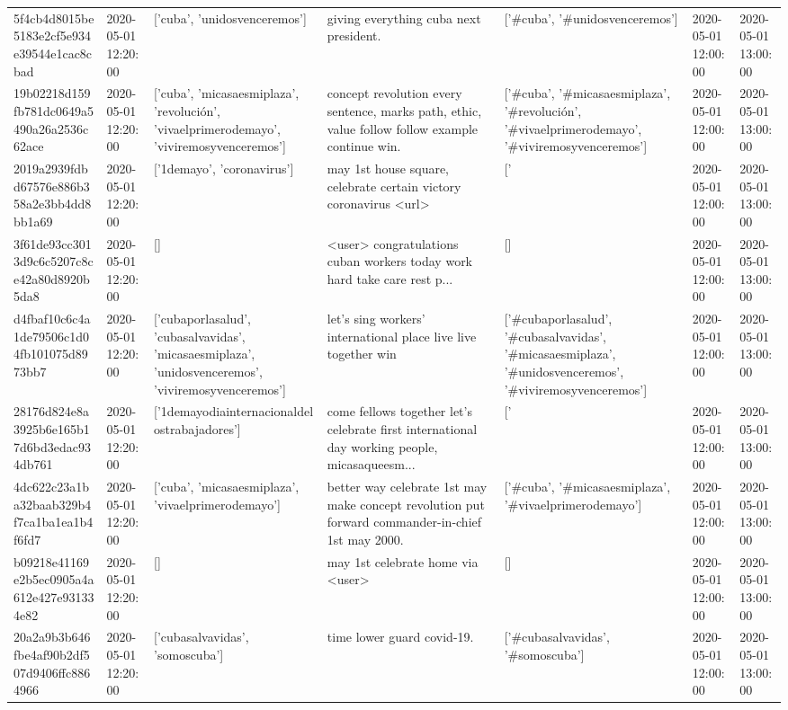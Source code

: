 \begin{tabular}{lllllll}
5f4cb4d8015be5183e2cf5e934e39544e1cac8cbad & 2020-05-01 12:20:00 & ['cuba', 'unidosvenceremos'] & giving everything cuba next president. & ['#cuba', '#unidosvenceremos'] & 2020-05-01 12:00:00 & 2020-05-01 13:00:00 \\
19b02218d159fb781dc0649a5490a26a2536c62ace & 2020-05-01 12:20:00 & ['cuba', 'micasaesmiplaza', 'revolución', 'vivaelprimerodemayo', 'viviremosyvenceremos'] & concept revolution every sentence, marks path, ethic, value follow follow example continue win. & ['#cuba', '#micasaesmiplaza', '#revolución', '#vivaelprimerodemayo', '#viviremosyvenceremos'] & 2020-05-01 12:00:00 & 2020-05-01 13:00:00 \\
2019a2939fdbd67576e886b358a2e3bb4dd8bb1a69 & 2020-05-01 12:20:00 & ['1demayo', 'coronavirus'] & may 1st house square, celebrate certain victory coronavirus <url> & ['#1demayo', '#coronavirus'] & 2020-05-01 12:00:00 & 2020-05-01 13:00:00 \\
3f61de93cc3013d9c6c5207c8ce42a80d8920b5da8 & 2020-05-01 12:20:00 & [] & <user> congratulations cuban workers today work hard take care rest p... & [] & 2020-05-01 12:00:00 & 2020-05-01 13:00:00 \\
d4fbaf10c6c4a1de79506c1d04fb101075d8973bb7 & 2020-05-01 12:20:00 & ['cubaporlasalud', 'cubasalvavidas', 'micasaesmiplaza', 'unidosvenceremos', 'viviremosyvenceremos'] & let's sing workers' international place live live together win & ['#cubaporlasalud', '#cubasalvavidas', '#micasaesmiplaza', '#unidosvenceremos', '#viviremosyvenceremos'] & 2020-05-01 12:00:00 & 2020-05-01 13:00:00 \\
28176d824e8a3925b6e165b17d6bd3edac934db761 & 2020-05-01 12:20:00 & ['1demayodiainternacionaldelostrabajadores'] & come fellows together let's celebrate first international day working people, micasaqueesm... & ['#1demayodiainternacionaldelostrabajadores'] & 2020-05-01 12:00:00 & 2020-05-01 13:00:00 \\
4dc622c23a1ba32baab329b4f7ca1ba1ea1b4f6fd7 & 2020-05-01 12:20:00 & ['cuba', 'micasaesmiplaza', 'vivaelprimerodemayo'] & better way celebrate 1st may make concept revolution put forward commander-in-chief 1st may 2000. & ['#cuba', '#micasaesmiplaza', '#vivaelprimerodemayo'] & 2020-05-01 12:00:00 & 2020-05-01 13:00:00 \\
b09218e41169e2b5ec0905a4a612e427e931334e82 & 2020-05-01 12:20:00 & [] & may 1st celebrate home via <user> & [] & 2020-05-01 12:00:00 & 2020-05-01 13:00:00 \\
20a2a9b3b646fbe4af90b2df507d9406ffc8864966 & 2020-05-01 12:20:00 & ['cubasalvavidas', 'somoscuba'] & time lower guard covid-19. & ['#cubasalvavidas', '#somoscuba'] & 2020-05-01 12:00:00 & 2020-05-01 13:00:00 \\

\end{tabular}
